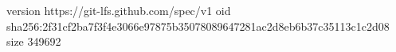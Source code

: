 version https://git-lfs.github.com/spec/v1
oid sha256:2f31cf2ba7f3f4e3066e97875b35078089647281ac2d8eb6b37c35113c1c2d08
size 349692

